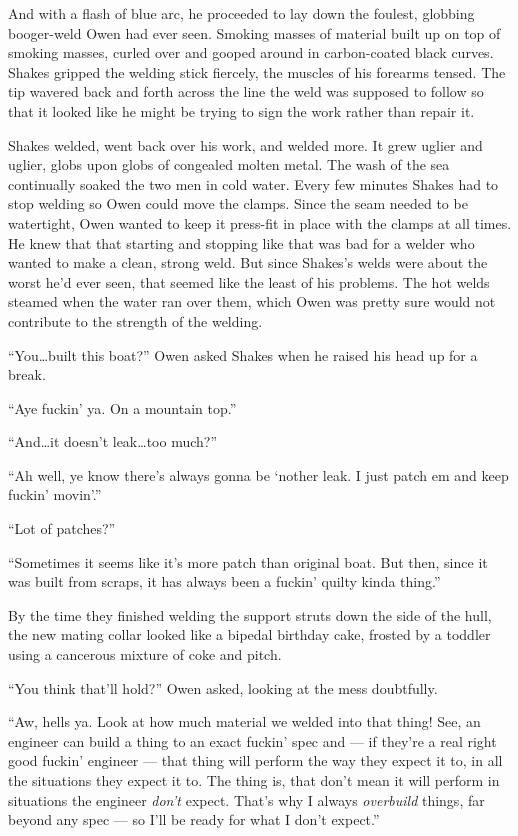 \documentclass[
]{scrbook}
\begin{document}
And with a flash of blue arc, he proceeded to lay down the foulest,
globbing booger-weld Owen had ever seen. Smoking masses of material
built up on top of smoking masses, curled over and gooped around in
carbon-coated black curves. Shakes gripped the welding stick fiercely,
the muscles of his forearms tensed. The tip wavered back and forth
across the line the weld was supposed to follow so that it looked like
he might be trying to sign the work rather than repair it.

Shakes welded, went back over his work, and welded more. It grew uglier
and uglier, globs upon globs of congealed molten metal. The wash of the
sea continually soaked the two men in cold water. Every few minutes
Shakes had to stop welding so Owen could move the clamps. Since the seam
needed to be watertight, Owen wanted to keep it press-fit in place with
the clamps at all times. He knew that that starting and stopping like
that was bad for a welder who wanted to make a clean, strong weld. But
since Shakes's welds were about the worst he'd ever seen, that seemed
like the least of his problems. The hot welds steamed when the water ran
over them, which Owen was pretty sure would not contribute to the
strength of the welding.

``You\ldots built this boat?'' Owen asked Shakes when he raised his head
up for a break.

``Aye fuckin' ya. On a mountain top.''

``And\ldots it doesn't leak\ldots too much?''

``Ah well, ye know there's always gonna be `nother leak. I just patch em
and keep fuckin' movin'.''

``Lot of patches?''

``Sometimes it seems like it's more patch than original boat. But then,
since it was built from scraps, it has always been a fuckin' quilty
kinda thing.''

By the time they finished welding the support struts down the side of
the hull, the new mating collar looked like a bipedal birthday cake,
frosted by a toddler using a cancerous mixture of coke and pitch.

``You think that'll hold?'' Owen asked, looking at the mess doubtfully.

``Aw, hells ya. Look at how much material we welded into that thing!
See, an engineer can build a thing to an exact fuckin' spec and --- if
they're a real right good fuckin' engineer --- that thing will perform
the way they expect it to, in all the situations they expect it to. The
thing is, that don't mean it will perform in situations the engineer
\emph{don't} expect. That's why I always \emph{overbuild} things, far
beyond any spec --- so I'll be ready for what I don't expect.''
\end{document}
